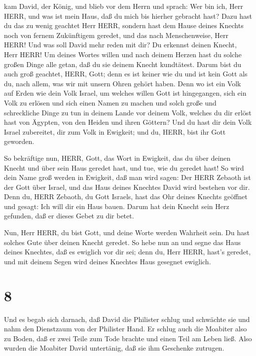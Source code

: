  kam David, der König, und blieb vor dem Herrn und sprach:
Wer bin ich, Herr HERR, und was ist mein Haus, daß du mich bis hierher
gebracht hast?  Dazu hast du das zu wenig geachtet Herr
HERR, sondern hast dem Hause deines Knechts noch von fernem Zukünftigem
geredet, und das nach Menschenweise, Herr HERR!  Und was
soll David mehr reden mit dir? Du erkennst deinen Knecht, Herr HERR!
 Um deines Wortes willen und nach deinem Herzen hast du
solche großen Dinge alle getan, daß du sie deinem Knecht kundtätest.
 Darum bist du auch groß geachtet, HERR, Gott; denn es ist
keiner wie du und ist kein Gott als du, nach allem, was wir mit unsern
Ohren gehört haben.  Denn wo ist ein Volk auf Erden wie
dein Volk Israel, um welches willen Gott ist hingegangen, sich ein Volk
zu erlösen und sich einen Namen zu machen und solch große und
schreckliche Dinge zu tun in deinem Lande vor deinem Volk, welches du
dir erlöst hast von Ägypten, von den Heiden und ihren Göttern?
 Und du hast dir dein Volk Israel zubereitet, dir zum Volk
in Ewigkeit; und du, HERR, bist ihr Gott geworden.

 So bekräftige nun, HERR, Gott, das Wort in Ewigkeit, das
du über deinen Knecht und über sein Haus geredet hast, und tue, wie du
geredet hast!  So wird dein Name groß werden in Ewigkeit,
daß man wird sagen: Der HERR Zebaoth ist der Gott über Israel, und das
Haus deines Knechtes David wird bestehen vor dir.  Denn du,
HERR Zebaoth, du Gott Israels, hast das Ohr deines Knechts geöffnet und
gesagt: Ich will dir ein Haus bauen. Darum hat dein Knecht sein Herz
gefunden, daß er dieses Gebet zu dir betet.

 Nun, Herr HERR, du bist Gott, und deine Worte werden
Wahrheit sein. Du hast solches Gute über deinen Knecht geredet.
 So hebe nun an und segne das Haus deines Knechtes, daß es
ewiglich vor dir sei; denn du, Herr HERR, hast's geredet, und mit deinem
Segen wird deines Knechtes Haus gesegnet ewiglich.

\hypertarget{section-7}{%
\section{8}\label{section-7}}

 Und es begab sich darnach, daß David die Philister schlug
und schwächte sie und nahm den Dienstzaum von der Philister Hand.
 Er schlug auch die Moabiter also zu Boden, daß er zwei
Teile zum Tode brachte und einen Teil am Leben ließ. Also wurden die
Moabiter David untertänig, daß sie ihm Geschenke zutrugen.

